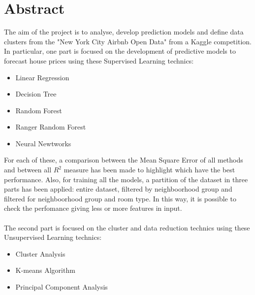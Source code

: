 \documentclass{FR16}
\begin{document}
\maketitle

\newpage
\tableofcontents
\newpage
\section{Abstract}
The aim of the project is to analyse, develop prediction models and define data clusters from the "New York City Airbnb Open Data" from a Kaggle competition.
\\ In particular, one part is focused on the development of predictive models to forecast house prices using these Supervised Learning technics:\begin{itemize}
\itemsep0em 
\item Linear Regression
\item Decision Tree
\item Random Forest
\item Ranger Random Forest
\item Neural Newtworks
\end{itemize}
For each of these, a comparison between the Mean Square Error of all methods and between all $R^2$ measure has been made to highlight which have the best performance. Also, for training all the models, a partition of the dataset in three parts has been applied: entire dataset, filtered by neighboorhood group and filtered for neighboorhood group and room type. In this way, it is possible to check the perfomance giving less or more features in input.\\\\
The second part is focused on the cluster and data reduction technics using these Unsupervised Learning technics:
\begin{itemize}
\itemsep0em
\item Cluster Analysis
\item K-means Algorithm
\item Principal Component Analysis
\end{itemize}
\end{document}
